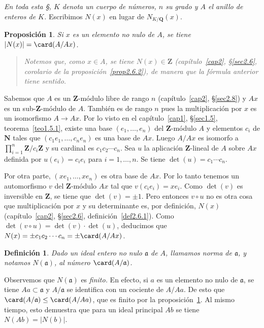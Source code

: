 \documentclass[bibtotoc,leqno,spanish]{amsbook}
\newcommand{\QQ}{\mathbf{Q}}
\newcommand{\ZZ}{\mathbf{Z}}
\newcommand{\NN}{\mathbf{N}}
\newcommand{\idl}[1]{\mathfrak{#1}}
\newcommand{\QED}{LQQD.}
\newcommand{\abs}[1]{\left\lvert#1\right\rvert}
\renewcommand{\to}[1][]{\xrightarrow{#1}}
\numberwithin{equation}{section}
\newenvironment{comm}%
	{\begin{quotation}\itshape\Small}
	{\end{quotation}}
\theoremstyle{note}
\newtheorem{definition}{Definici\'on}
\theoremstyle{note}
\newtheorem{proposition}{Proposici\'on}
\theoremstyle{rem}
\numberwithin{theorem}{section}
\numberwithin{proposition}{section}
\numberwithin{definition}{section}
\numberwithin{lemma}{section}
\numberwithin{corollary}{section}
\numberwithin{example}{section}
\numberwithin{footnote}{section}%
\begin{document}
\begin{trivlist}\item
{\itshape En toda esta \S, $K$ denota un cuerpo de n\'umeros, $n$ su grado y $A$ el anillo
de enteros de $K$.} Escribimos $N(x)$ en lugar de $N_{K/\QQ}(x)$.
\end{trivlist}

\begin{proposition}\label{prop3.5.1}
Si $x$ es un elemento no nulo de $A$, se tiene $\abs{N(x)} = \card(A/Ax)$.
\end{proposition}

\begin{comm}
Notemos que, como $x\in A$, se tiene $N(x)\in\ZZ$ (cap\'itulo~\ref{cap2}, \S\ref{sec2.6}, corolario de la
proposici\'on~\ref{prop2.6.2}), de manera que
la f\'ormula anterior tiene sentido.
\end{comm}

Sabemos que $A$ es un $\ZZ$-m\'odulo libre de rango $n$ (cap\'itulo~\ref{cap2}, \S\ref{sec2.8}) y $Ax$ es un
sub-$\ZZ$-m\'odulo de $A$. Tambi\'en es de rango $n$ pues la multiplicaci\'on por $x$
es un isomorfismo $A\to Ax$. Por lo visto en el cap\'itulo~\ref{cap1}, \S\ref{sec1.5}, teorema~\ref{teo1.5.1}, existe una base
$(e_{1},\dots,e_{n})$ del $\ZZ$-m\'odulo $A$ y elementos $c_{i}$ de $\NN$ tales que
$(c_{1}e_{1},\dots,c_{n}e_{n})$ es una base de $Ax$. Luego $A/Ax$ es isomorfo a
$\prod_{i=1}^{n}\ZZ/c_{i}\ZZ$ y su cardinal es $c_{1}c_{2}\cdots c_{n}$. Sea $u$ la
aplicaci\'on $\ZZ$-lineal de $A$ sobre $Ax$ definida por $u(e_{i}) = c_{i}e_{i}$ para
$i=1,\dots,n$. Se tiene $\det(u) = c_{1}\cdots c_{n}$.

Por otra parte, $(xe_{1},\dots,xe_{n})$ es otra base de $Ax$. Por lo tanto tenemos un automorfismo
$v$ del $\ZZ$-m\'odulo $Ax$ tal que $v(c_{i}e_{i}) = xe_{i}$. Como $\det(v)$ es inversible en $\ZZ$,
se tiene que $\det(v)=\pm 1$. Pero entonces $v\circ u$ no es otra cosa que multiplicaci\'on por $x$
y su determinante es, por definici\'on, $N(x)$ (cap\'itulo~\ref{cap2}, \S\ref{sec2.6},
definici\'on~\ref{def2.6.1}). Como $\det(v\circ u)=
\det(v)\cdot\det(u)$, deducimos que $N(x) = \pm c_{1}c_{2}\cdots c_{n}=\pm \card(A/Ax)$.%

\begin{definition}\label{def3.5.1}
Dado un ideal entero no nulo $\idl{a}$ de $A$, llamamos norma de $\idl{a}$, y notamos $N(\idl{a})$,
al n\'umero $\card(A/\idl{a})$.
\end{definition}

Observemos que $N(\idl{a})$ es {\em finito.} En efecto, si $a$ es un elemento no nulo de $\idl{a}$,
se tiene $Aa\subset\idl{a}$ y $A/\idl{a}$ se identifica con un cociente de $A/Aa$. De esto que
$\card(A/\idl{a})\leq\card(A/Aa)$, que es finito por la proposici\'on~\ref{prop3.5.1}. Al mismo tiempo, esto demuestra que
para un ideal principal $Ab$ se tiene $N(Ab) = \abs{N(b)}$.
\end{document}
